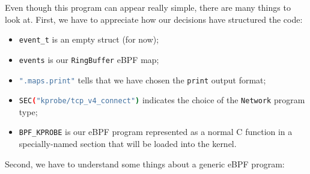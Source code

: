 Even though this program can appear really simple, there are many things to look at.
First, we have to appreciate how our decisions have structured the code:

\begin{itemize}
	\item 
		\colorbox{backcolour}{\lstinline[style=commandline, language=bash, breaklines=true]|event_t|} is an empty struct (for now);
	\item 
		\colorbox{backcolour}{\lstinline[style=commandline, language=bash, breaklines=true]|events|} is our \colorbox{backcolour}{\lstinline[style=commandline, language=bash, breaklines=true]|RingBuffer|} eBPF map;
	\item 
		\colorbox{backcolour}{\lstinline[style=commandline, language=bash, breaklines=true]|".maps.print"|} tells that we have chosen the \colorbox{backcolour}{\lstinline[style=commandline, language=bash, breaklines=true]|print|} output format;
	\item 
		\colorbox{backcolour}{\lstinline[style=commandline, language=bash, breaklines=true]|SEC("kprobe/tcp_v4_connect")|} indicates the choice of the \colorbox{backcolour}{\lstinline[style=commandline, language=bash, breaklines=true]|Network|} program type;
	\item 
		\colorbox{backcolour}{\lstinline[style=commandline, language=bash, breaklines=true]|BPF_KPROBE|} is our eBPF program represented as a normal C function in a specially-named section that will be loaded into the kernel.
\end{itemize}

Second, we have to understand some things about a generic eBPF program:

